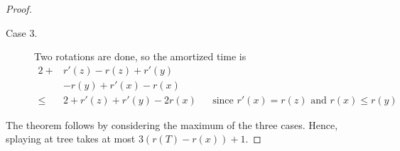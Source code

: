 \documentclass{subfiles}
\begin{document}
\begin{proof}
\begin{description}
                \item [Case 3. ] Two rotations are done, so the amortized time is 
                    \[\begin{aligned}
                        2 + & r'(z) - r(z) + r'(y) && \\ 
                            & - r(y) + r'(x) - r(x) && \\ 
                        \le & 2 + r'(z) + r'(y) - 2r(x) && \text{since \(r'(x) = r(z)\) and \(r(x) \le r(y)\)} 
                    \end{aligned}\]
            \end{description}

        The theorem follows by considering the maximum of the three cases. Hence,
            splaying at tree takes at most \(3(r(T) - r(x)) + 1\).
    \end{proof}
    
\end{document}
